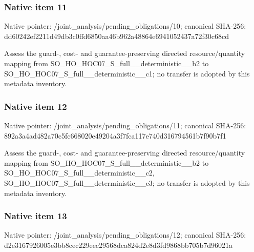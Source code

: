 \documentclass[10pt,a4paper]{article}
\begin{document}
\subsubsection{Native item 11}
Native pointer: /joint\_\allowbreak{}analysis/pending\_\allowbreak{}obligations/10; canonical SHA-256: dd60242ef2211d49db3c0ffd6850aa46b962a48864e6941052437a72f30c68cd

\begingroup\raggedright\sloppy Assess the guard-,\allowbreak{} cost- and guarantee-preserving directed resource/\allowbreak{}quantity mapping from SO\_\allowbreak{}HO\_\allowbreak{}HOC07\_\allowbreak{}S\_\allowbreak{}full\_\allowbreak{}\_\allowbreak{}deterministic\_\allowbreak{}\_\allowbreak{}b2 to SO\_\allowbreak{}HO\_\allowbreak{}HOC07\_\allowbreak{}S\_\allowbreak{}full\_\allowbreak{}\_\allowbreak{}deterministic\_\allowbreak{}\_\allowbreak{}c1;\allowbreak{} no transfer is adopted by this metadata inventory.\par\endgroup

\subsubsection{Native item 12}
Native pointer: /joint\_\allowbreak{}analysis/pending\_\allowbreak{}obligations/11; canonical SHA-256: 892a3a4ad482a70c5fc668020e49204a3f7fca117e740d316794561b7f90b7f1

\begingroup\raggedright\sloppy Assess the guard-,\allowbreak{} cost- and guarantee-preserving directed resource/\allowbreak{}quantity mapping from SO\_\allowbreak{}HO\_\allowbreak{}HOC07\_\allowbreak{}S\_\allowbreak{}full\_\allowbreak{}\_\allowbreak{}deterministic\_\allowbreak{}\_\allowbreak{}b2 to SO\_\allowbreak{}HO\_\allowbreak{}HOC07\_\allowbreak{}S\_\allowbreak{}full\_\allowbreak{}\_\allowbreak{}deterministic\_\allowbreak{}\_\allowbreak{}c2,\allowbreak{} SO\_\allowbreak{}HO\_\allowbreak{}HOC07\_\allowbreak{}S\_\allowbreak{}full\_\allowbreak{}\_\allowbreak{}deterministic\_\allowbreak{}\_\allowbreak{}c3;\allowbreak{} no transfer is adopted by this metadata inventory.\par\endgroup

\subsubsection{Native item 13}
Native pointer: /joint\_\allowbreak{}analysis/pending\_\allowbreak{}obligations/12; canonical SHA-256: d2e3167926005e3bb8cec229eec29568dca824d2e8d3fd9868bb705b7d96021a
\end{document}
